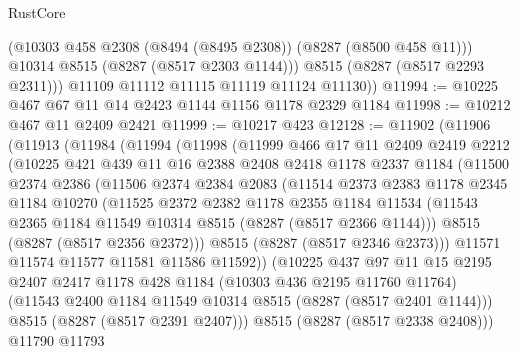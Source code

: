 \begin{lexlean}{RustCore}
\begin{coremodule}
            (@10303 @458 @2308 (@8494 (@8495 @2308)) (@8287 (@8500 @458 @11)))
            @10314
            @8515
            (@8287 (@8517 @2303 @1144)))
          @8515
          (@8287 (@8517 @2293 @2311)))
        @11109
        @11112
        @11115
        @11119
        @11124
        @11130))
@11994 := @10225 @467 @67 @11 @14 @2423 @1144 @1156 @1178 @2329 @1184
@11998 := @10212 @467 @11 @2409 @2421
@11999 := @10217 @423
@12128 := @11902
    (@11906
      (@11913
        (@11984
          (@11994
            (@11998
              (@11999
                @466
                @17
                @11
                @2409
                @2419
                @2212
                (@10225
                  @421
                  @439
                  @11
                  @16
                  @2388
                  @2408
                  @2418
                  @1178
                  @2337
                  @1184
                  (@11500
                    @2374
                    @2386
                    (@11506
                      @2374
                      @2384
                      @2083
                      (@11514
                        @2373
                        @2383
                        @1178
                        @2345
                        @1184
                        @10270
                        (@11525
                          @2372
                          @2382
                          @1178
                          @2355
                          @1184
                          @11534
                          (@11543 @2365 @1184 @11549 @10314 @8515 (@8287 (@8517 @2366 @1144)))
                          @8515
                          (@8287 (@8517 @2356 @2372)))
                        @8515
                        (@8287 (@8517 @2346 @2373)))
                      @11571
                      @11574
                      @11577
                      @11581
                      @11586
                      @11592))
                  (@10225
                    @437
                    @97
                    @11
                    @15
                    @2195
                    @2407
                    @2417
                    @1178
                    @428
                    @1184
                    (@10303 @436 @2195 @11760 @11764)
                    (@11543 @2400 @1184 @11549 @10314 @8515 (@8287 (@8517 @2401 @1144)))
                    @8515
                    (@8287 (@8517 @2391 @2407)))
                  @8515
                  (@8287 (@8517 @2338 @2408)))
                @11790
                @11793

\end{coremodule}
\end{lexlean}
